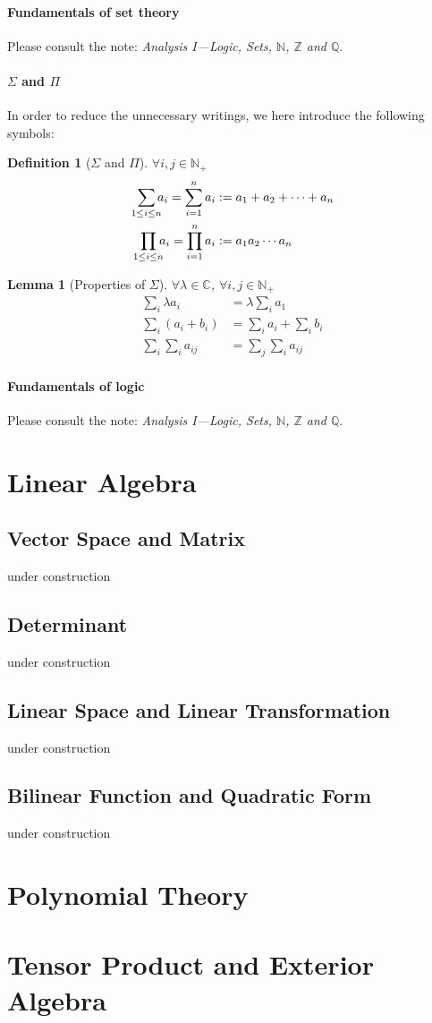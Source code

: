 \documentclass[a4paper,oneside]{book}
\newtheorem{definition}{Definition}[section]
\newtheorem{lemma}{Lemma}[section]
\begin{document}
				\subsection{Fundamentals of set theory}
					Please consult the note: \textit{Analysis I---Logic, Sets, $\mathbb{N}$, $\mathbb{Z}$ and $\mathbb{Q}$}.
				\subsection{$\Sigma$ and $\Pi$}
					In order to reduce the unnecessary writings, we here introduce the following symbols:
					\begin{definition}[$\Sigma$ and $\Pi$]
						$\forall i,j\in\mathbb{N}_+$
						\begin{align*}
							\sum_{1\leq i\leq n}\mspace{-9mu}a_i=\sum_{i=1}^{n}a_i&:=a_1+a_2+\dotsb +a_n\\
							\prod_{1\leq i\leq n}\mspace{-9mu}a_i=\prod_{i=1}^{n}a_i&:=a_1a_2\dotsm a_n
						\end{align*}
					\end{definition}
				\begin{lemma}[Properties of $\Sigma$]
					$\forall \lambda\in\mathbb{C}$, $\forall i,j\in\mathbb{N}_+$
					\begin{align*}
						\sum_{i}\lambda a_i&=\lambda\sum_{i}a_1\\
						\sum_{i}(a_i+b_i)&=\sum_{i}a_i+\sum_{i}b_i\\
						\sum_{i}\sum_{i}a_{ij}&=\sum_{j}\sum_{i}a_{ij}
					\end{align*}
				\end{lemma}
				\subsection{Fundamentals of logic}
					Please consult the note: \textit{Analysis I---Logic, Sets, $\mathbb{N}$, $\mathbb{Z}$ and $\mathbb{Q}$}.
\part{Linear Algebra}
	\chapter{Vector Space and Matrix}
	under construction
	\chapter{Determinant}
	under construction
	\chapter{Linear Space and Linear Transformation}
	under construction
	\chapter{Bilinear Function and Quadratic Form}
	under construction
\part{Polynomial Theory}

\part{Tensor Product and Exterior Algebra}
\end{document}
